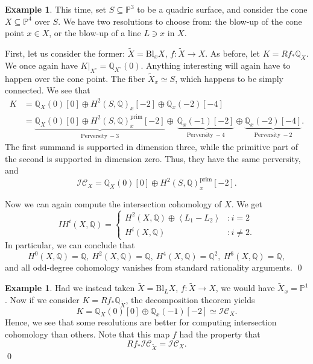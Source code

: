 \documentclass[12pt]{amsart}
\newcommand{\Q}{\mathbb{Q}}
\newcommand{\wt}{\widetilde}
\theoremstyle{definition}
\newtheorem{example}[theorem]{Example}
\theoremstyle{remark}
\numberwithin{equation}{section}
\begin{document}
\begin{example}
This time, set \(S \subseteq \mathbb{P}^3\) to be a quadric surface, and consider
the cone \(X \subseteq \mathbb{P}^4\) over \(S\). We have two resolutions to 
choose from: the blow-up of the cone point \(x \in X\), or the blow-up of a line 
\(L \ni x\) in \(X\).

First, let us consider the former: \(\wt{X} = \mathrm{Bl}_x X\), \(f: \wt{X} \to X\). 
As before, let \(K = Rf_* \Q_X\). We once again have \(K|_{X^\circ} = \Q_{X^\circ}(0)\).
Anything interesting will again have to happen over the cone point. The fiber 
\(\wt{X}_x \simeq S\), which happens to be simply connected. We see that 
\begin{align*}
    K &= \Q_X(0)[0] \oplus H^2(S, \Q)_x[-2] \oplus \Q_x(-2)[-4] \\
    &= \underbrace{\Q_X(0)[0] \oplus H^2(S, \Q)_x^{\mathrm{prim}}[-2]}_{\mathrm{Perversity}\ -3}
    \oplus\ \underbrace{\Q_x(-1)[-2]}_{\mathrm{Perversity}\ -4} \oplus 
    \underbrace{\Q_x(-2)[-4]}_{\mathrm{Perversity}\ -2}.
\end{align*}
The first summand is supported in dimension three, while the primitive part of the second 
is supported in dimension zero. Thus, they have the same perversity, and 
\begin{equation}
    \mathscr{IC}_X = \Q_X(0)[0] \oplus H^2(S, \Q)_x^{\mathrm{prim}}[-2].
\end{equation}

Now we can again compute the intersection cohomology of \(X\). We get 
\begin{equation}
    IH^i(X, \Q) = \begin{cases}
        H^2(X, \Q) \oplus \left<L_1 - L_2\right> & : i = 2\\
        H^i(X, \Q) & : i \neq 2.
    \end{cases}
\end{equation}
In particular, we can conclude that 
\begin{equation}
    H^0(X, \Q) = \Q,\ H^2(X, \Q) = \Q,\ H^4(X, \Q) = \Q^2,\ H^6(X, \Q) = \Q, 
\end{equation}
and all odd-degree cohomology vanishes from standard rationality arguments.
\qed
\end{example}

\begin{example}
Had we instead taken \(\wt{X} = \mathrm{Bl}_L X\), \(f: \wt{X} \to X\), we would have 
\(\wt{X}_x = \mathbb{P}^1\). Now if we consider \(K = Rf_* \Q_{\wt{X}}\), the 
decomposition theorem yields 
\begin{equation}
    K = \Q_X(0)[0] \oplus \Q_x(-1)[-2] \simeq \mathscr{IC}_X.
\end{equation}
Hence, we see that some resolutions are better for computing intersection cohomology 
than others. Note that this map \(f\) had the property that 
\begin{equation}
    Rf_* \mathscr{IC}_{\wt{X}} = \mathscr{IC}_X.
\end{equation}
\qed
\end{example}







\end{document}
